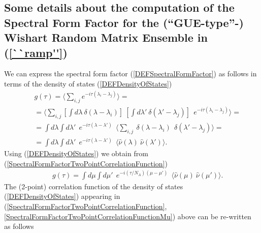\documentclass[aps,prb,preprint,onecolumn,amsmath,amssymb,superscriptaddress,eqsecnum,floatfix,scrartcl]{revtex4-1}
\begin{document}
\subsection{Some details about  the computation of the  Spectral Form Factor for the (``GUE-type''-) Wishart Random Matrix Ensemble
in (\ref{``ramp''})}
\label{SubSectionAppendixDetailsOnTheSpectralFormFactorWishart}

We can express the spectral form factor (\ref{DEFSpectralFormFactor}) as follows in terms of the density of states (\ref{DEFDensityOfStates})
\begin{eqnarray}\nonumber
&&g(\tau) =  \langle\sum_{i,j} e^{-i \tau (\lambda_i-\lambda_j)}\rangle = \\ \nonumber
&& = \langle\sum_{i,j}
[\int d \lambda \ \delta(\lambda - \lambda_i)]
\ 
[\int d \lambda' \ \delta(\lambda' - \lambda_j)] 
\ \  e^{-i \tau (\lambda_i-\lambda_j)}\rangle= \\  \nonumber
&&=
\int d \lambda \int d \lambda' \ \  e^{-i \tau (\lambda-\lambda')} \ \ 
 \langle\sum_{i,j} \ \delta(\lambda - \lambda_i)
\ \ \delta(\lambda' - \lambda_j)\rangle= \\ 
\label{SpectralFormFactorTwoPointCorrelationFunction}
&& =
\int d \lambda \int d \lambda' \ \  e^{-i \tau (\lambda-\lambda')} \ \ 
 \langle{\hat \nu}(\lambda) \ {\hat \nu}(\lambda')\rangle.
\end{eqnarray}
Using (\ref{DEFDensityOfStates})
we obtain from (\ref{SpectralFormFactorTwoPointCorrelationFunction})
\begin{eqnarray}
\label{SpectralFormFactorTwoPointCorrelationFunctionMu}
&&g(\tau) = 
\int d \mu \int d \mu' \ \  e^{-i (\tau/N_A) (\mu-\mu')} \ \ 
 \langle{\hat \nu}(\mu) \ {\hat \nu}(\mu')\rangle.
\end{eqnarray}
The (2-point) correlation function of the density of states (\ref{DEFDensityOfStates})
appearing in
(\ref{SpectralFormFactorTwoPointCorrelationFunction},\ref{SpectralFormFactorTwoPointCorrelationFunctionMu}) above
can be re-written as follows
\end{document}
